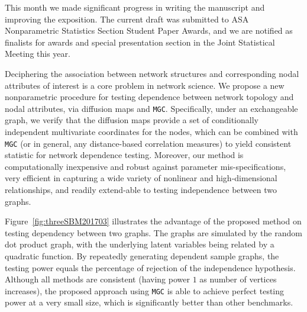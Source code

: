 \documentclass[simplex.tex]{subfiles}
\begin{document}

This month we made significant progress in writing the manuscript and improving the exposition. The current draft was submitted to ASA Nonparametric Statistics Section Student Paper Awards, and we are notified as finalists for awards and special presentation section in the Joint Statistical Meeting this year. 

\clearpage



Deciphering the association between network structures and corresponding nodal attributes of interest is a core problem in network science. We propose a new nonparametric procedure for testing dependence between network topology and nodal attributes, via diffusion maps and \texttt{MGC}. Specifically, under an exchangeable graph, we verify that the diffusion maps provide a set of conditionally independent multivariate coordinates for the nodes, which can be combined with \texttt{MGC} (or in general, any distance-based correlation measures) to yield consistent statistic for network dependence testing. Moreover, our method is computationally inexpensive and robust against parameter mis-specifications, very efficient in capturing a wide variety of nonlinear and high-dimensional relationships, and readily extend-able to testing independence between two graphs. 

Figure~\ref{fig:threeSBM201703} illustrates the advantage of the proposed method on testing dependency between two graphs. The graphs are simulated by the random dot product graph, with the underlying latent variables being related by a quadratic function. By repeatedly generating dependent sample graphs, the testing power equals the percentage of rejection of the independence hypothesis. Although all methods are consistent (having power $1$ as number of vertices increases), the proposed approach using \texttt{MGC} is able to achieve perfect testing power at a very small size, which is significantly better than other benchmarks.
\end{document}
